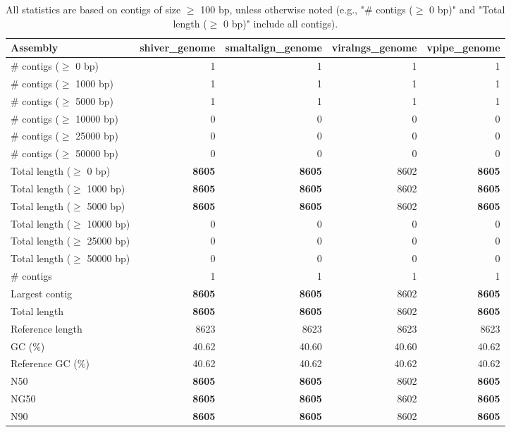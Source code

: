 \documentclass[12pt,a4paper]{article}
\begin{document}
\begin{table}[ht]
\begin{center}
\caption{All statistics are based on contigs of size $\geq$ 100 bp, unless otherwise noted (e.g., "\# contigs ($\geq$ 0 bp)" and "Total length ($\geq$ 0 bp)" include all contigs).}
\begin{tabular}{|l*{4}{|r}|}
\hline
Assembly & shiver\_genome & smaltalign\_genome & viralngs\_genome & vpipe\_genome \\ \hline
\# contigs ($\geq$ 0 bp) & 1 & 1 & 1 & 1 \\ \hline
\# contigs ($\geq$ 1000 bp) & 1 & 1 & 1 & 1 \\ \hline
\# contigs ($\geq$ 5000 bp) & 1 & 1 & 1 & 1 \\ \hline
\# contigs ($\geq$ 10000 bp) & 0 & 0 & 0 & 0 \\ \hline
\# contigs ($\geq$ 25000 bp) & 0 & 0 & 0 & 0 \\ \hline
\# contigs ($\geq$ 50000 bp) & 0 & 0 & 0 & 0 \\ \hline
Total length ($\geq$ 0 bp) & {\bf 8605} & {\bf 8605} & 8602 & {\bf 8605} \\ \hline
Total length ($\geq$ 1000 bp) & {\bf 8605} & {\bf 8605} & 8602 & {\bf 8605} \\ \hline
Total length ($\geq$ 5000 bp) & {\bf 8605} & {\bf 8605} & 8602 & {\bf 8605} \\ \hline
Total length ($\geq$ 10000 bp) & 0 & 0 & 0 & 0 \\ \hline
Total length ($\geq$ 25000 bp) & 0 & 0 & 0 & 0 \\ \hline
Total length ($\geq$ 50000 bp) & 0 & 0 & 0 & 0 \\ \hline
\# contigs & 1 & 1 & 1 & 1 \\ \hline
Largest contig & {\bf 8605} & {\bf 8605} & 8602 & {\bf 8605} \\ \hline
Total length & {\bf 8605} & {\bf 8605} & 8602 & {\bf 8605} \\ \hline
Reference length & 8623 & 8623 & 8623 & 8623 \\ \hline
GC (\%) & 40.62 & 40.60 & 40.60 & 40.62 \\ \hline
Reference GC (\%) & 40.62 & 40.62 & 40.62 & 40.62 \\ \hline
N50 & {\bf 8605} & {\bf 8605} & 8602 & {\bf 8605} \\ \hline
NG50 & {\bf 8605} & {\bf 8605} & 8602 & {\bf 8605} \\ \hline
N90 & {\bf 8605} & {\bf 8605} & 8602 & {\bf 8605} \\ \hline

\end{tabular}
\end{center}
\end{table}
\end{document}
